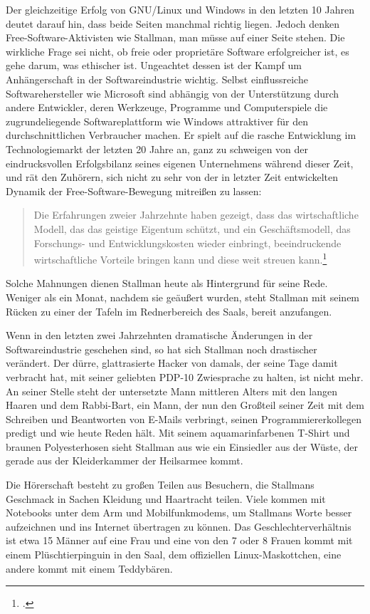 Der gleichzeitige Erfolg von GNU/Linux und Windows in den letzten 10 Jahren deutet darauf hin, dass beide Seiten manchmal richtig liegen. Jedoch denken Free-Software-Aktivisten wie Stallman, man müsse auf einer Seite stehen. Die wirkliche Frage sei nicht, ob freie oder proprietäre Software erfolgreicher ist, es gehe darum, was ethischer ist. Ungeachtet dessen ist der Kampf um Anhängerschaft in der Softwareindustrie wichtig. Selbst einflussreiche Softwarehersteller wie Microsoft sind abhängig von der Unterstützung durch andere Entwickler, deren Werkzeuge, Programme und Computerspiele die zugrundeliegende Softwareplattform wie Windows attraktiver für den durchschnittlichen Verbraucher machen. Er spielt auf die rasche Entwicklung im Technologiemarkt der letzten 20 Jahre an, ganz zu schweigen von der eindrucksvollen Erfolgsbilanz seines eigenen Unternehmens während dieser Zeit, und rät den Zuhörern, sich nicht zu sehr von der in letzter Zeit entwickelten Dynamik der Free-Software-Bewegung mitreißen zu lassen:
\begin{quote}
Die Erfahrungen zweier Jahrzehnte haben gezeigt, dass das wirtschaftliche Modell, das das geistige Eigentum schützt, und ein Geschäftsmodell, das Forschungs- und Entwicklungskosten wieder einbringt, beeindruckende wirtschaftliche Vorteile bringen kann und diese weit streuen kann.\footcite[][]{mundie}
\end{quote}

Solche Mahnungen dienen Stallman heute als Hintergrund für seine Rede. Weniger als ein Monat, nachdem sie geäußert wurden, steht Stallman mit seinem Rücken zu einer der Tafeln im Rednerbereich des Saals, bereit anzufangen.

Wenn in den letzten zwei Jahrzehnten dramatische Änderungen in der Softwareindustrie geschehen sind, so hat sich Stallman noch drastischer verändert. Der dürre, glattrasierte Hacker von damals, der seine Tage damit verbracht hat, mit seiner geliebten PDP-10 Zwiesprache zu halten, ist nicht mehr. An seiner Stelle steht der untersetzte Mann mittleren Alters mit den langen Haaren und dem Rabbi-Bart, ein Mann, der nun den Großteil seiner Zeit mit dem Schreiben und Beantworten von E-Mails verbringt, seinen Programmiererkollegen predigt und wie heute Reden hält. Mit seinem aquamarinfarbenen T-Shirt und braunen Polyesterhosen sieht Stallman aus wie ein Einsiedler aus der Wüste, der gerade aus der Kleiderkammer der Heilsarmee kommt.


Die Hörerschaft besteht zu großen Teilen aus Besuchern, die Stallmans Geschmack in Sachen Kleidung und Haartracht teilen. Viele kommen mit Notebooks unter dem Arm und Mobilfunkmodems, um Stallmans Worte besser aufzeichnen und ins Internet übertragen zu können. Das Geschlechterverhältnis ist etwa 15 Männer auf eine Frau und eine von den 7 oder 8 Frauen kommt mit einem Plüschtierpinguin in den Saal, dem offiziellen Linux-Maskottchen, eine andere kommt mit einem Teddybären.

